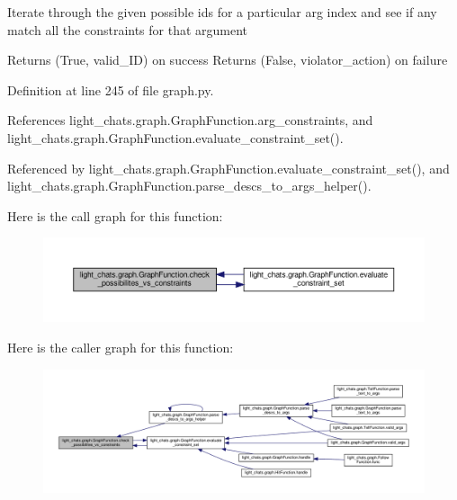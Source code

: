 \begin{DoxyVerb}Iterate through the given possible ids for a particular arg index
and see if any match all the constraints for that argument

Returns (True, valid_ID) on success
Returns (False, violator_action) on failure
\end{DoxyVerb}
 

Definition at line 245 of file graph.\+py.



References light\+\_\+chats.\+graph.\+Graph\+Function.\+arg\+\_\+constraints, and light\+\_\+chats.\+graph.\+Graph\+Function.\+evaluate\+\_\+constraint\+\_\+set().



Referenced by light\+\_\+chats.\+graph.\+Graph\+Function.\+evaluate\+\_\+constraint\+\_\+set(), and light\+\_\+chats.\+graph.\+Graph\+Function.\+parse\+\_\+descs\+\_\+to\+\_\+args\+\_\+helper().

Here is the call graph for this function\+:
\nopagebreak
\begin{figure}[H]
\begin{center}
\leavevmode
\includegraphics[width=350pt]{classlight__chats_1_1graph_1_1GraphFunction_af627ff84086a094b84da04e30a97779e_cgraph}
\end{center}
\end{figure}
Here is the caller graph for this function\+:
\nopagebreak
\begin{figure}[H]
\begin{center}
\leavevmode
\includegraphics[width=350pt]{classlight__chats_1_1graph_1_1GraphFunction_af627ff84086a094b84da04e30a97779e_icgraph}
\end{center}
\end{figure}
\mbox{\label{classlight__chats_1_1graph_1_1GraphFunction_a2110ae09489d9ebc9291a1fd39d8c4cd}} 
